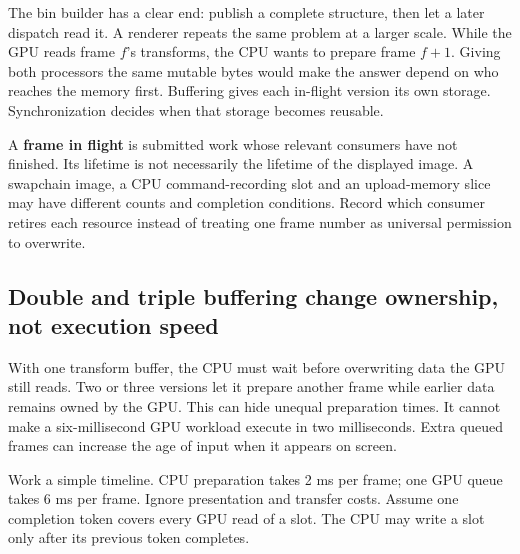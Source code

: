 \hypertarget{03-visual-computing-i-ch016-keep-a-frames-memory-alive-until-its-final-consumer-is-finished}{}

The bin builder has a clear end: publish a complete structure, then let a later dispatch read it. A renderer repeats the same problem at a larger scale. While the GPU reads frame \(f\)'s transforms, the CPU wants to prepare frame \(f+1\). Giving both processors the same mutable bytes would make the answer depend on who reaches the memory first. Buffering gives each in-flight version its own storage. Synchronization decides when that storage becomes reusable.

A \textbf{frame in flight} is submitted work whose relevant consumers have not finished. Its lifetime is not necessarily the lifetime of the displayed image. A swapchain image, a CPU command-recording slot and an upload-memory slice may have different counts and completion conditions. Record which consumer retires each resource instead of treating one frame number as universal permission to overwrite.

\subsection{Double and triple buffering change ownership, not execution speed}\label{03-visual-computing-i-ch016-double-and-triple-buffering-change-ownership-not-execution-speed}

\hypertarget{03-visual-computing-i-ch016-double-and-triple-buffering-change-ownership-not-execution-speed}{}

With one transform buffer, the CPU must wait before overwriting data the GPU still reads. Two or three versions let it prepare another frame while earlier data remains owned by the GPU. This can hide unequal preparation times. It cannot make a six-millisecond GPU workload execute in two milliseconds. Extra queued frames can increase the age of input when it appears on screen.

Work a simple timeline. CPU preparation takes 2 ms per frame; one GPU queue takes 6 ms per frame. Ignore presentation and transfer costs. Assume one completion token covers every GPU read of a slot. The CPU may write a slot only after its previous token completes.

